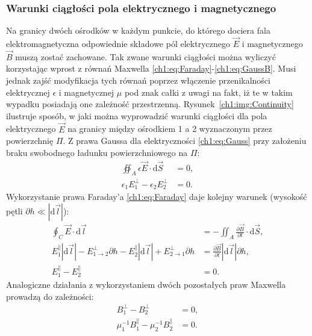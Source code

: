 \subsubsection{Warunki ciągłości pola elektrycznego i magnetycznego }
Na granicy dwóch ośrodków w każdym punkcie, do którego dociera fala elektromagnetyczna odpowiednie składowe pól elektrycznego $\vec{E}$ i magnetycznego $\vec{B}$ muszą zostać zachowane. Tak zwane warunki ciągłości można wyliczyć korzystając wprost z równań Maxwella \eqref{ch1:eq:Faraday}-\eqref{ch1:eq:GaussB}. Musi jednak zajść modyfikacja tych równań poprzez włączenie przenikalności elektrycznej $\epsilon$ i magnetycznej $\mu$ pod znak całki z uwagi na fakt, iż te w takim wypadku posiadają one zależność przestrzenną.
Rysunek~\ref{ch1:img:Continuity} ilustruje sposób, w jaki można wyprowadzić warunki ciągłości dla pola elektrycznego $\vec{E}$ na granicy między ośrodkiem 1 a 2 wyznaczonym przez powierzchnię $\Pi$. Z prawa Gaussa dla elektryczności \eqref{ch1:eq:Gauss} przy założeniu braku swobodnego ładunku powierzchniowego na $\Pi$:
\begin{align}
\oiint_A \epsilon\vec{E}\cdot\mathrm{d}\vec{S} &= 0, \nonumber\\
\epsilon_1E_1^\perp - \epsilon_2E_2^\perp &= 0.
\end{align}
Wykorzystanie prawa Faraday'a \eqref{ch1:eq:Faraday} daje kolejny warunek (wysokość pętli $\partial h \ll |\mathrm{d}\vec{l}|$):
\begin{align}
\oint_C\vec{E}\cdot \mathrm{d}\vec{l} &= -\iint_A\frac{\partial\vec{B}}{\partial t}\cdot \mathrm{d}\vec{S},\nonumber\\
E_1^\parallel|\mathrm{d}\vec{l}| - E_{1\rightarrow 2}^\perp\partial h - E_2^\parallel|\mathrm{d}\vec{l}| + E_{2\rightarrow 1}^\perp\partial h &= \frac{\partial\vec{B}}{\partial t}|\mathrm{d}\vec{l}|\partial h,\nonumber\\
\label{ch1:eq:EParallelContinuity}
E_1^\parallel - E_2^\parallel &= 0.
\end{align}
Analogiczne działania z wykorzystaniem dwóch pozostałych praw Maxwella prowadzą do zależności:
\begin{align}
B_1^\perp - B_2^\perp &= 0,\\
\label{ch1:eq:BParallelContinuity}
\mu_1^{-1}B_1^\parallel - \mu_2^{-1}B_2^\parallel &= 0.
\end{align}
